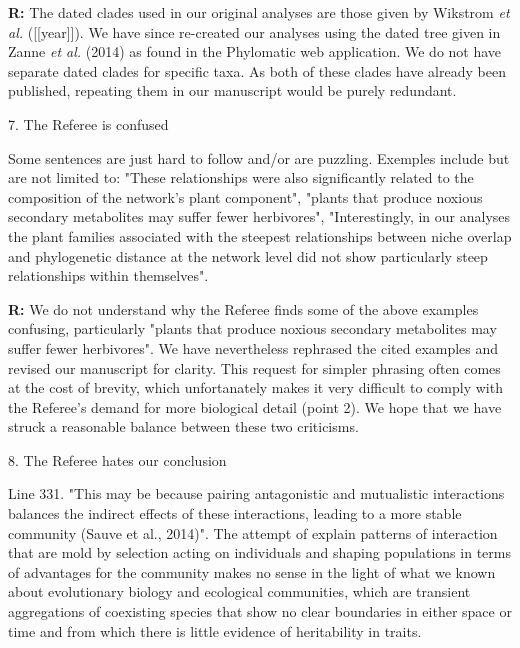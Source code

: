 \documentclass[12pt]{letter}
\newenvironment{refquote}{\bigskip \begin{it}}{\end{it}\smallskip}
\begin{document}
      \textbf{R:} The dated clades used in our original analyses are those given by Wikstrom \emph{et al.} ([[year]]). We have since re-created our analyses using the dated tree given in Zanne \emph{et al.} (2014) as found in the Phylomatic web application. We do not have separate dated clades for specific taxa. As both of these clades have already been published, repeating them in our manuscript would be purely redundant.


  7. The Referee is confused  

    \begin{refquote}

      Some sentences are just hard to follow and/or are puzzling. Exemples include but are not limited to: "These relationships were also significantly related to the composition of the network’s plant component", "plants that produce noxious secondary metabolites may suffer fewer herbivores", "Interestingly, in our analyses the plant families associated with the steepest relationships between niche overlap and phylogenetic distance at the network level did not show particularly steep relationships within themselves".

    \end{refquote}


    \textbf{R:} We do not understand why the Referee finds some of the above examples confusing, particularly "plants that produce noxious secondary metabolites may suffer fewer herbivores". We have nevertheless rephrased the cited examples and revised our manuscript for clarity. This request for simpler phrasing often comes at the cost of brevity, which unfortanately makes it very difficult to comply with the Referee's demand for more biological detail (point 2). We hope that we have struck a reasonable balance between these two criticisms.


  8. The Referee hates our conclusion

    \begin{refquote}

      Line 331. "This may be because pairing antagonistic and mutualistic interactions balances the indirect effects of these interactions, leading to a more stable community (Sauve et al., 2014)". The attempt of explain patterns of interaction that are mold by selection acting on individuals and shaping populations in terms of advantages for the community makes no sense in the light of what we known about evolutionary biology and ecological communities, which are transient aggregations of coexisting species that show no clear boundaries in either space or time and from which there is little evidence of heritability in traits.

      \end{refquote}
\end{document}
